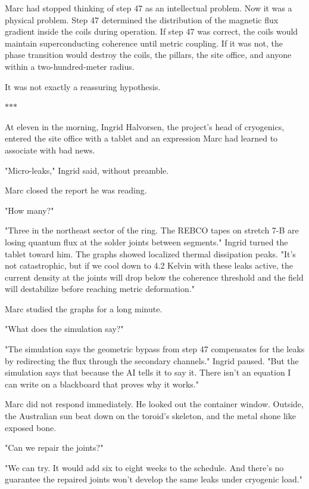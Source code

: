 \documentclass[11pt,a5paper,twoside]{book}
\begin{document}
Marc had stopped thinking of step 47 as an intellectual problem. Now it was a physical problem. Step 47 determined the distribution of the magnetic flux gradient inside the coils during operation. If step 47 was correct, the coils would maintain superconducting coherence until metric coupling. If it was not, the phase transition would destroy the coils, the pillars, the site office, and anyone within a two-hundred-meter radius.

It was not exactly a reassuring hypothesis.

\vspace{1.5em}
\begin{center}$\ast$\quad$\ast$\quad$\ast$\end{center}
\vspace{1.5em}

At eleven in the morning, Ingrid Halvorsen, the project's head of cryogenics, entered the site office with a tablet and an expression Marc had learned to associate with bad news.

"Micro-leaks," Ingrid said, without preamble.

Marc closed the report he was reading.

"How many?"

"Three in the northeast sector of the ring. The REBCO tapes on stretch 7-B are losing quantum flux at the solder joints between segments." Ingrid turned the tablet toward him. The graphs showed localized thermal dissipation peaks. "It's not catastrophic, but if we cool down to 4.2 Kelvin with these leaks active, the current density at the joints will drop below the coherence threshold and the field will destabilize before reaching metric deformation."

Marc studied the graphs for a long minute.

"What does the simulation say?"

"The simulation says the geometric bypass from step 47 compensates for the leaks by redirecting the flux through the secondary channels." Ingrid paused. "But the simulation says that because the AI tells it to say it. There isn't an equation I can write on a blackboard that proves why it works."

Marc did not respond immediately. He looked out the container window. Outside, the Australian sun beat down on the toroid's skeleton, and the metal shone like exposed bone.

"Can we repair the joints?"

"We can try. It would add six to eight weeks to the schedule. And there's no guarantee the repaired joints won't develop the same leaks under cryogenic load."
\end{document}
